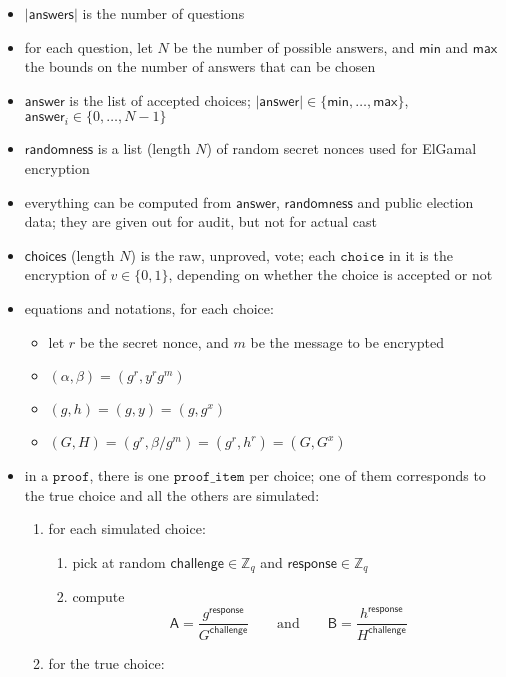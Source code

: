 \documentclass[a4paper]{article}
\newcommand{\Z}{\mathbb{Z}}
\begin{document}
\begin{itemize}
\item $|\textsf{answers}|$ is the number of questions
\item for each question, let $N$ be the number of possible answers,
  and $\textsf{min}$ and $\textsf{max}$ the bounds on the number of
  answers that can be chosen
\item $\textsf{answer}$ is the list of accepted choices;
  $|\textsf{answer}|\in\{\textsf{min},\dots,\textsf{max}\}$,
  $\textsf{answer}_i\in\{0,\dots,N-1\}$
\item $\textsf{randomness}$ is a list (length $N$) of random secret
  nonces used for ElGamal encryption
\item everything can be computed from $\textsf{answer}$,
  $\textsf{randomness}$ and public election data; they are given out
  for audit, but not for actual cast
\item $\textsf{choices}$ (length $N$) is the raw, unproved, vote; each
  $\texttt{choice}$ in it is the encryption of $v\in\{0,1\}$,
  depending on whether the choice is accepted or not
\item equations and notations, for each choice:
  \begin{itemize}
  \item let $r$ be the secret nonce, and $m$ be the message to be
    encrypted
  \item $(\alpha,\beta)=(g^r, y^r g^m)$
  \item $(g,h)=(g,y)=(g,g^x)$
  \item $(G,H)=(g^r,\beta/g^m)=(g^r,h^r)=(G,G^x)$
  \end{itemize}
\item in a $\texttt{proof}$, there is one $\texttt{proof\_item}$ per
  choice; one of them corresponds to the true choice and all the
  others are simulated:
  \begin{enumerate}
  \item for each simulated choice:
    \begin{enumerate}
    \item pick at random $\textsf{challenge}\in\Z_q$ and $\textsf{response}\in\Z_q$
    \item compute
      \[
      \textsf{A}=\frac{g^{\textsf{response}}}{G^{\textsf{challenge}}}
      \qquad\textrm{and}\qquad
      \textsf{B}=\frac{h^{\textsf{response}}}{H^{\textsf{challenge}}}
      \]
    \end{enumerate}
  \item for the true choice:
    \begin{enumerate}

\end{enumerate}
\end{enumerate}
\end{itemize}
\end{document}
